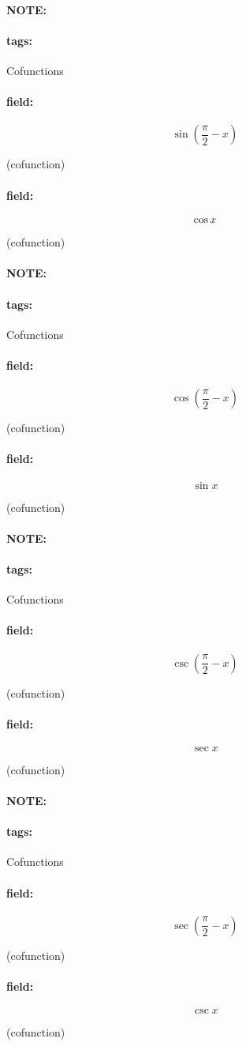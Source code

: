\documentclass[12pt]{article}
\newenvironment{note}{\paragraph{NOTE:}}{}
\newenvironment{field}{\paragraph{field:}}{}
\newcommand*{\tags}[1]{\paragraph{tags: }#1}
\begin{document}
\begin{note}
    \tags{Cofunctions}
    \begin{field}
    \[  
          \sin(\frac{\pi}{2} - x) 
    \] 
    \begin{center}
    (cofunction)
    \end{center}
    \end{field}
    \begin{field}
    \[
        \cos x\\
    \] 
    \begin{center}
    (cofunction)
    \end{center}
    \end{field}
\end{note}

\begin{note}
    \tags{Cofunctions}
    \begin{field}
    \[  
        \cos(\frac{\pi}{2} - x)
    \] 
    \begin{center}
        (cofunction)
    \end{center}
    \end{field}
    \begin{field}
    \[
        \sin x
    \] 
    \begin{center}
        (cofunction)
    \end{center}
    \end{field}
\end{note}

\begin{note}
    \tags{Cofunctions}
    \begin{field}
    \[  
        \csc(\frac{\pi}{2} - x)
    \] 
    \begin{center}
    (cofunction)
    \end{center}
    \end{field}
    \begin{field}
    \[
        \sec x
    \]
    \begin{center}
    (cofunction)
    \end{center}
    \end{field}
\end{note}

\begin{note}
    \tags{Cofunctions}
    \begin{field}
    \[  
        \sec(\frac{\pi}{2} - x)
    \] 
    \begin{center}
    (cofunction)
\end{center}
    \end{field}
    \begin{field}
    \[
        \csc x
    \] 
    \begin{center}
    (cofunction)
\end{center}
    \end{field}
\end{note}
\end{document}
